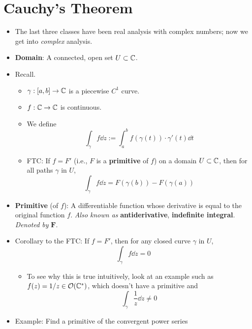 \documentclass[../notes.tex]{subfiles}
\begin{document}
\section{Cauchy's Theorem}
\begin{itemize}
    \item {}The last three classes have been real analysis with complex numbers; now we get into \emph{complex} analysis.
    \item \textbf{Domain}: A connected, open set $U\subset\mathbb{C}$.
    \item Recall.
    \begin{itemize}
        \item $\gamma:[a,b]\to\mathbb{C}$ is a piecewise $C^1$ curve.
        \item $f:\mathbb{C}\to\mathbb{C}$ is continuous.
        \item We define
        \begin{equation*}
            \int_\gamma f\dd{z} := \int_a^bf(\gamma(t))\cdot\gamma'(t)\dd{t}
        \end{equation*}
        \item FTC: If $f=F'$ (i.e., $F$ is a \textbf{primitive} of $f$) on a domain $U\subset\mathbb{C}$, then for all paths $\gamma$ in $U$,
        \begin{equation*}
            \int_\gamma f\dd{z} = F(\gamma(b))-F(\gamma(a))
        \end{equation*}
    \end{itemize}
    \item \textbf{Primitive} (of $f$): A differentiable function whose derivative is equal to the original function $f$. \emph{Also known as} \textbf{antiderivative}, \textbf{indefinite integral}. \emph{Denoted by} $\bm{F}$.
    \item Corollary to the FTC: If $f=F'$, then for any closed curve $\gamma$ in $U$,
    \begin{equation*}
        \int_\gamma f\dd{z} = 0
    \end{equation*}
    \begin{itemize}
        \item To see why this is true intuitively, look at an example such as $f(z)=1/z\in\mathcal{O}(\mathbb{C}^*)$, which doesn't have a primitive and
        \begin{equation*}
            \int_\gamma\frac{1}{z}\dd{z} \neq 0
        \end{equation*}
    \end{itemize}
    \item Example: Find a primitive of the convergent power series

\end{itemize}
\end{document}
